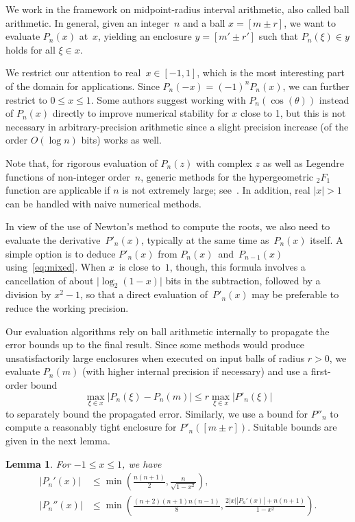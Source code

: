 \documentclass[11pt,a4paper]{article}
\newtheorem{lemma}[theorem]{Lemma}
\newcommand{\abs}[1]{\mathopen| #1 \mathclose|}
\begin{document}
\label{sec:general}

We work in the framework on midpoint-radius interval arithmetic,
also called ball arithmetic.
In general, given an integer~$n$ and a ball $x = [m \pm r]$,
we want to evaluate $P_n(x)$ at~$x$,
yielding an enclosure $y = [m' \pm r']$ such that $P_n(\xi) \in y$
holds for all $\xi \in x$.

We restrict our attention to real~$x \in [-1, 1]$,
which is the most interesting part of the domain for applications.
Since $P_n(-x) = (-1)^n P_n(x)$, we can further
restrict to $0 \le x \le 1$.
Some authors suggest working with $P_n(\cos(\theta))$ instead of $P_n(x)$
directly to improve numerical stability for $x$ close to 1, but
this is not necessary in arbitrary-precision arithmetic since
a slight precision increase (of the order $O(\log n)$ bits)
works as well.

Note that, for rigorous evaluation of $P_n(z)$ with complex $z$
as well as Legendre functions of non-integer order $n$,
generic methods for the hypergeometric ${}_2F_1$ function
are applicable if $n$ is not extremely large; see~\cite{johansson2016hypergeometric}.
In addition, real $|x| > 1$ can be handled with naive numerical methods.

In view of the use of Newton's method to compute the roots,
we also need to evaluate the derivative $P'_n(x)$,
typically at the same time as $P_n(x)$ itself.
A simple option is to deduce $P'_n(x)$ from
$P_n(x)$ and $P_{n-1}(x)$ using \eqref{eq:mixed}.
When $x$ is close to $1$, though, this formula involves a
cancellation of about $\abs{\log_2(1 - x)}$ bits in the subtraction,
followed by a division by $x^2 - 1$, so that a direct evaluation
of $P'_n(x)$ may be preferable to reduce the working precision.

Our evaluation algorithms rely on ball arithmetic internally to
propagate the error bounds up to the final result.
Since some methods would produce unsatisfactorily large enclosures
when executed on input balls of radius $r > 0$, we evaluate $P_n(m)$
(with higher internal precision if necessary) and use a first-order
bound
\[ \max_{\xi \in x} |P_n(\xi) - P_n(m)|
   \le r \max_{\xi \in x} |P'_n(\xi)| \]
to separately bound the propagated error.
Similarly, we use a bound for $P''_n$ to compute a reasonably
tight enclosure for $P'_n([m \pm r])$.
Suitable bounds are given in the next lemma.

\begin{lemma} \label{lemma:prop-bound}
For $-1 \leq x \leq 1$, we have
\begin{align}
\label{eq:prop-bound}
  |P_n'(x)| &\le \min\left(\frac{n(n+1)}{2},
                          \frac{n}{\sqrt{1-x^2}}\right), \\
\label{eq:prop-bound1}
  |P_n''(x)| &\le \min\left(\frac{(n+2)(n+1)n(n-1)}{8},
                           \frac{2|x||P_n'(x)| + n(n+1)}{1-x^2}\right).
\end{align}
\end{lemma}
\end{document}
